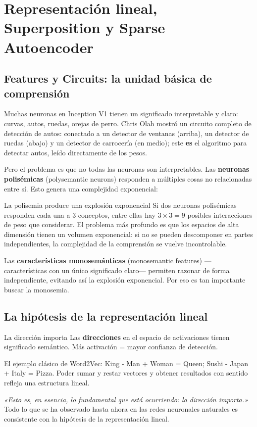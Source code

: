 \section{Representación lineal, Superposition y Sparse Autoencoder}

\subsection{Features y Circuits: la unidad básica de comprensión}

Muchas neuronas en Inception V1 tienen un significado interpretable y claro: curvas, autos, ruedas, orejas de perro. Chris Olah mostró un circuito completo de detección de autos: conectado a un detector de ventanas (arriba), un detector de ruedas (abajo) y un detector de carrocería (en medio); este \textbf{es} el algoritmo para detectar autos, leído directamente de los pesos.

Pero el problema es que no todas las neuronas son interpretables. Las \textbf{neuronas polisémicas} (polysemantic neurons) responden a múltiples cosas no relacionadas entre sí. Esto genera una complejidad exponencial:

\begin{warningbox}{La polisemia produce una explosión exponencial}
Si dos neuronas polisémicas responden cada una a 3 conceptos, entre ellas hay $3 \times 3 = 9$ posibles interacciones de peso que considerar. El problema más profundo es que los espacios de alta dimensión tienen un volumen exponencial: si no se pueden descomponer en partes independientes, la complejidad de la comprensión se vuelve incontrolable.

Las \textbf{características monosemánticas} (monosemantic features) —características con un único significado claro— permiten razonar de forma independiente, evitando así la explosión exponencial. Por eso es tan importante buscar la monosemia.
\end{warningbox}

\subsection{La hipótesis de la representación lineal}

\begin{importantbox}{La dirección importa}
Las \textbf{direcciones} en el espacio de activaciones tienen significado semántico. Más activación = mayor confianza de detección.

El ejemplo clásico de Word2Vec: King - Man + Woman = Queen; Sushi - Japan + Italy = Pizza. Poder sumar y restar vectores y obtener resultados con sentido refleja una estructura lineal.

\textit{«Esto es, en esencia, lo fundamental que está ocurriendo: la dirección importa.»} Todo lo que se ha observado hasta ahora en las redes neuronales naturales es consistente con la hipótesis de la representación lineal.
\end{importantbox}

